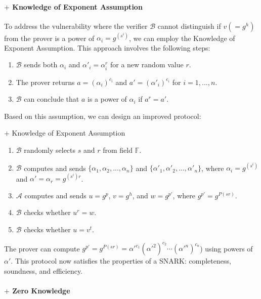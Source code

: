 \documentclass{article}
\begin{document}
\paragraph{$+$ Knowledge of Exponent Assumption}

To address the vulnerability where the verifier $\mathcal{B}$ cannot distinguish if $v (= g^h)$ from the prover is a power of $\alpha_i = g^{(s^i)}$, we can employ the Knowledge of Exponent Assumption. This approach involves the following steps:

\begin{enumerate}
    \item $\mathcal{B}$ sends both $\alpha_i$ and $\alpha'_i = \alpha_i^r$ for a new random value $r$.
    \item The prover returns $a = (\alpha_i)^{c_i}$ and $a' = (\alpha'_i)^{c_i}$ for $i = 1, ..., n$.
    \item $\mathcal{B}$ can conclude that $a$ is a power of $\alpha_i$ if $a^r = a'$.
\end{enumerate}

Based on this assumption, we can design an improved protocol:

\begin{protocol}{$+$ Knowledge of Exponent Assumption}{}
\begin{enumerate}
    \item $\mathcal{B}$ randomly selects $s$ and $r$ from field $\mathbb{F}$.
    \item $\mathcal{B}$ computes and sends $\{\alpha_1, \alpha_2, ..., \alpha_{n}\}$ and $\{\alpha'_1, \alpha'_2, ..., \alpha'_{n}\}$, where $\alpha_i = g^{(s^i)}$ and $\alpha' = \alpha_{r} = g^{(s^{i})r}$.
    \item $\mathcal{A}$ computes and sends $u = g^{p}$, $v = g^{h}$, and $w = g^{p'}$, where $g^{p'} = g^{P(sr)}$.
    \item $\mathcal{B}$ checks whether $u^{r} = w$.
    \item $\mathcal{B}$ checks whether $u = v^{t}$.
\end{enumerate}
\end{protocol}

The prover can compute $g^{p'} = g^{P(sr)} = \alpha'^{c_1} (\alpha'^{2})^{c_2} \cdots (\alpha'^{n})^{c_n}$) using powers of $\alpha'$. This protocol now satisfies the properties of a SNARK: completeness, soundness, and efficiency.

\paragraph{$+$ Zero Knowledge}
\end{document}
